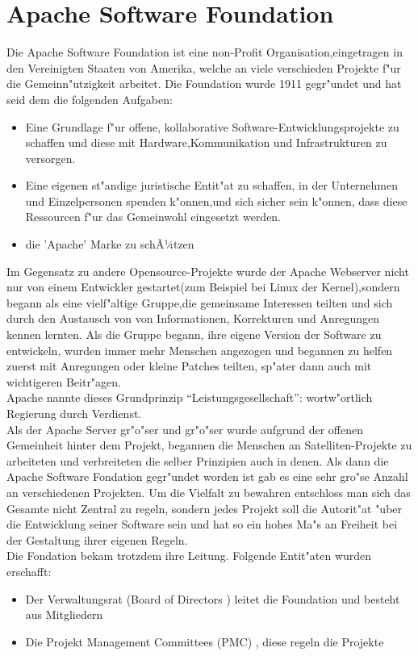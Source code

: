 
\section{Apache Software Foundation}
Die Apache Software Foundation ist eine non-Profit Organisation,eingetragen in den Vereinigten Staaten von Amerika, welche an viele verschieden Projekte f"ur die Gemeinn"utzigkeit arbeitet. Die Foundation wurde 1911 gegr"undet und hat seid dem die folgenden Aufgaben:
\begin{itemize}
\item{Eine Grundlage f"ur offene, kollaborative Software-Entwicklungsprojekte zu schaffen und diese mit Hardware,Kommunikation und Infrastrukturen zu versorgen. }
\item{Eine eigenen st"andige juristische Entit"at zu schaffen, in der Unternehmen und Einzelpersonen spenden k"onnen,und sich sicher sein k"onnen, dass diese Ressourcen f"ur das Gemeinwohl eingesetzt werden.}
\item{die 'Apache' Marke zu schÃ¼tzen}
\end{itemize}
Im Gegensatz zu andere Opensource-Projekte wurde der Apache Webserver nicht nur von einem Entwickler gestartet(zum Beispiel bei Linux der Kernel),sondern begann als eine vielf"altige Gruppe,die gemeinsame Interessen teilten und sich durch den Austausch von  von Informationen, Korrekturen und Anregungen kennen lernten.
Als die Gruppe begann, ihre eigene Version der Software zu entwickeln, wurden immer mehr Menschen angezogen und begannen zu helfen  zuerst  mit Anregungen oder kleine Patches teilten, sp"ater dann auch mit wichtigeren Beitr"agen. \\
Apache nannte dieses Grundprinzip ``Leistungsgesellschaft'': wortw"ortlich Regierung durch Verdienst.\\
Als der Apache Server gr"o"ser und gr"o"ser  wurde aufgrund der offenen Gemeinheit hinter dem Projekt, begannen die Menschen an Satelliten-Projekte  zu arbeiteten  und verbreiteten die selber Prinzipien auch in denen. Als dann die Apache Software Fondation gegr"undet worden ist gab es eine sehr gro"se Anzahl an verschiedenen Projekten. Um die Vielfalt zu bewahren entschloss man sich das Gesamte nicht Zentral zu regeln, sondern jedes Projekt soll die Autorit"at "uber die Entwicklung seiner Software sein und hat so ein hohes Ma"s an Freiheit bei der Gestaltung ihrer eigenen Regeln. \\
\newpage 
Die Fondation bekam trotzdem ihre Leitung. Folgende Entit"aten wurden erschafft:
\begin{itemize}
\item{Der Verwaltungsrat (Board of Directors ) leitet die Foundation und besteht aus Mitgliedern}
\item{Die Projekt Management Committees (PMC) , diese regeln die Projekte}
\end{itemize}

